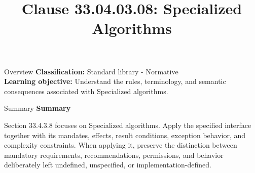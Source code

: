 \documentclass[10pt,letterpaper]{article}
\title{Clause 33.04.03.08: Specialized Algorithms}
\author{}
\date{}
\begin{document}
\maketitle
\begin{CornellOverviewBox}{Overview}
\textbf{Classification:} Standard library - Normative\\[2pt]
\textbf{Learning objective:} Understand the rules, terminology, and semantic consequences associated with Specialized algorithms.
\end{CornellOverviewBox}\begin{CornellSummaryBox}{Summary}
{\sffamily\bfseries\color{Accent} Summary}\par\vspace{3pt}Section 33.4.3.8 focuses on Specialized algorithms. Apply the specified interface together with its mandates, effects, result conditions, exception behavior, and complexity constraints. When applying it, preserve the distinction between mandatory requirements, recommendations, permissions, and behavior deliberately left undefined, unspecified, or implementation-defined.
\end{CornellSummaryBox}
\end{document}
